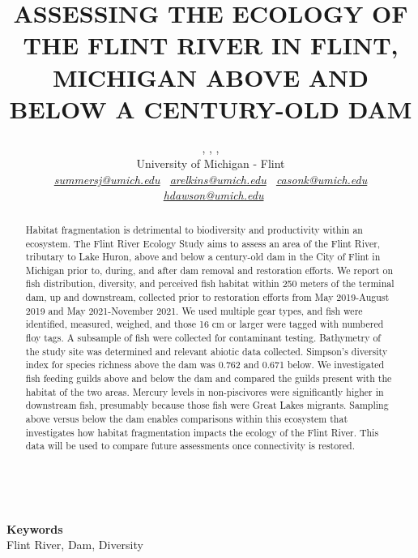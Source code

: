 \documentclass[a4paper, 12pt]{article} %
\date{} %
\def\keywords#1{\begin{center}{\bf Keywords}\\{#1}\end{center}} %
\begin{document}
\title{ASSESSING THE ECOLOGY OF THE FLINT RIVER IN FLINT, MICHIGAN ABOVE AND BELOW A CENTURY-OLD DAM}

\vspace{0.5cm}
\author{ , , ,   \\ %
       University of Michigan - Flint \\ %
       \textit{ \color{violet}
       \href{mailto:summersj@umich.edu}{summersj@umich.edu} \ \href{mailto:arelkins@umich.edu}{arelkins@umich.edu} \ \href{mailto:casonk@umich.edu}{casonk@umich.edu} \ \href{mailto:hdawson@umich.edu}{hdawson@umich.edu}}  %
       }%

\maketitle

\thispagestyle{empty}


\begin{abstract}
\vspace{0.5cm}

Habitat fragmentation is detrimental to biodiversity and productivity within an ecosystem. The Flint River Ecology Study aims to assess an area of the Flint River, tributary to Lake Huron, above and below a century-old dam in the City of Flint in Michigan prior to, during, and after dam removal and restoration efforts. We report on fish distribution, diversity, and perceived fish habitat within 250 meters of the terminal dam, up and downstream, collected prior to restoration efforts from May 2019-August 2019 and May 2021-November 2021. We used multiple gear types, and fish were identified, measured, weighed, and those 16 cm or larger were tagged with numbered floy tags. A subsample of fish were collected for contaminant testing. Bathymetry of the study site was determined and relevant abiotic data collected. Simpson’s diversity index for species richness above the dam was 0.762 and 0.671 below. We investigated fish feeding guilds above and below the dam and compared the guilds present with the habitat of the two areas. Mercury levels in non-piscivores were significantly higher in downstream fish, presumably because those fish were Great Lakes migrants. Sampling above versus below the dam enables comparisons within this ecosystem that investigates how habitat fragmentation impacts the ecology of the Flint River. This data will be used to compare future assessments once connectivity is restored.

\vspace{1.5cm}
\\
\vspace{5.5cm}

\end{abstract}

\keywords{Flint River, Dam, Diversity} %

\end{document}
